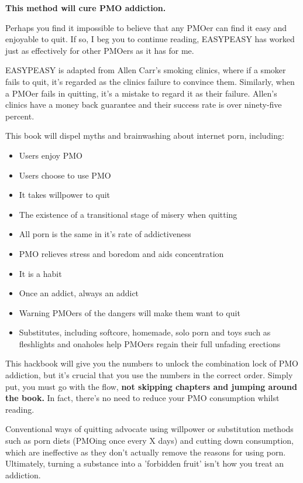 \documentclass[easypeasy.tex]{subfiles}
\begin{document}
\textbf{This method will cure PMO addiction.}

Perhaps you find it impossible to believe that any PMOer can find it easy and enjoyable to quit. If so, I beg you to continue reading, EASYPEASY has worked just as effectively for other PMOers as it has for me.

EASYPEASY is adapted from Allen Carr's smoking clinics, where if a smoker fails to quit, it's regarded as the clinics failure to convince them. Similarly, when a PMOer fails in quitting, it's a mistake to regard it as their failure. Allen's clinics have a money back guarantee and their success rate is over ninety-five percent.

This book will dispel myths and brainwashing about internet porn, including:
  \begin{itemize}
  \item Users enjoy PMO
  \item Users choose to use PMO
  \item It takes willpower to quit
  \item The existence of a transitional stage of misery when quitting
  \item All porn is the same in it's rate of addictiveness
  \item PMO relieves stress and boredom and aids concentration
  \item It is a habit
  \item Once an addict, always an addict
  \item Warning PMOers of the dangers will make them want to quit
  \item Substitutes, including softcore, homemade, solo porn and toys such as fleshlights and onaholes help PMOers regain their full unfading erections
\end{itemize}

This hackbook will give you the numbers to unlock the combination lock of PMO addiction, but it's crucial that you use the numbers in the correct order. Simply put, you must go with the flow, \textbf{not skipping chapters and jumping around the book.} In fact, there's no need to reduce your PMO consumption whilst reading.

Conventional ways of quitting advocate using willpower or substitution methods such as porn diets (PMOing once every X days) and cutting down consumption, which are ineffective as they don't actually remove the reasons for using porn. Ultimately, turning a substance into a 'forbidden fruit' isn't how you treat an addiction.
\end{document}
